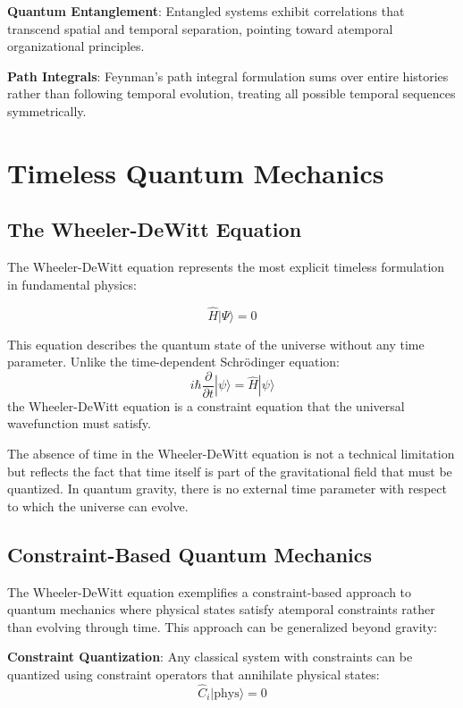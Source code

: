 \documentclass[12pt]{article}
\begin{document}
\textbf{Quantum Entanglement}: Entangled systems exhibit correlations that transcend spatial and temporal separation, pointing toward atemporal organizational principles.

\textbf{Path Integrals}: Feynman's path integral formulation sums over entire histories rather than following temporal evolution, treating all possible temporal sequences symmetrically.

\section{Timeless Quantum Mechanics}

\subsection{The Wheeler-DeWitt Equation}

The Wheeler-DeWitt equation represents the most explicit timeless formulation in fundamental physics:

\begin{equation}
\hat{H}|\Psi\rangle = 0
\end{equation}

This equation describes the quantum state of the universe without any time parameter. Unlike the time-dependent Schrödinger equation:
\begin{equation}
i\hbar\frac{\partial}{\partial t}|\psi\rangle = \hat{H}|\psi\rangle
\end{equation}
the Wheeler-DeWitt equation is a constraint equation that the universal wavefunction must satisfy.

The absence of time in the Wheeler-DeWitt equation is not a technical limitation but reflects the fact that time itself is part of the gravitational field that must be quantized. In quantum gravity, there is no external time parameter with respect to which the universe can evolve.

\subsection{Constraint-Based Quantum Mechanics}

The Wheeler-DeWitt equation exemplifies a constraint-based approach to quantum mechanics where physical states satisfy atemporal constraints rather than evolving through time. This approach can be generalized beyond gravity:

\textbf{Constraint Quantization}: Any classical system with constraints can be quantized using constraint operators that annihilate physical states:
\begin{equation}
\hat{C}_i|\text{phys}\rangle = 0
\end{equation}
\end{document}
